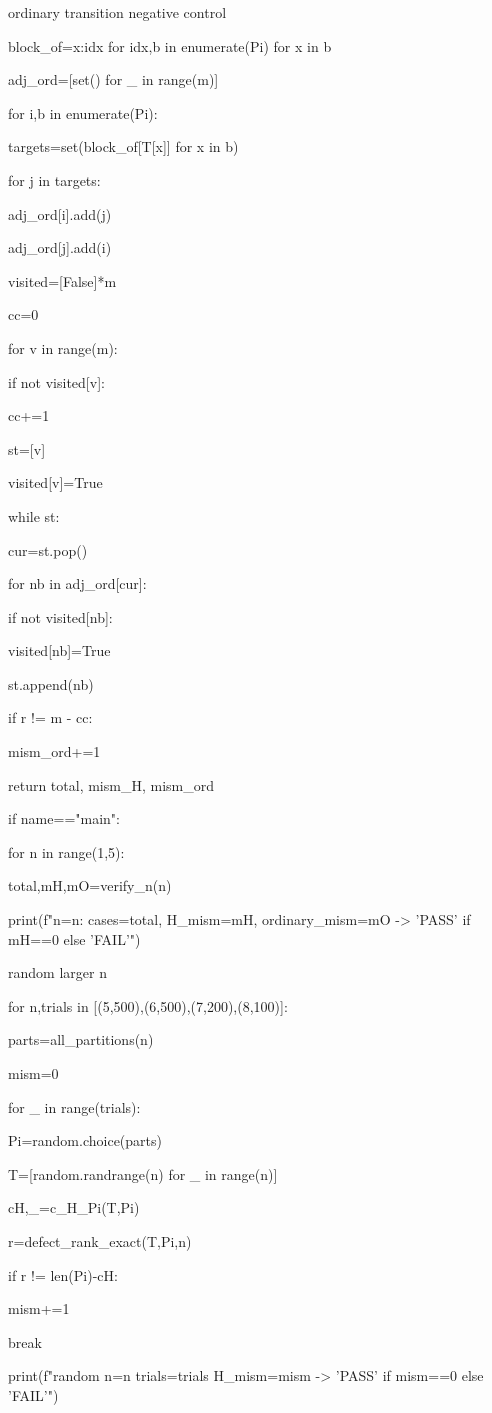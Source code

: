 ordinary transition negative control


block_of={x:idx for idx,b in enumerate(Pi) for x in b}

adj_ord=[set() for _ in range(m)]

for i,b in enumerate(Pi):

targets=set(block_of[T[x]] for x in b)

for j in targets:

adj_ord[i].add(j)

adj_ord[j].add(i)

visited=[False]*m

cc=0

for v in range(m):

if not visited[v]:

cc+=1

st=[v]

visited[v]=True

while st:

cur=st.pop()

for nb in adj_ord[cur]:

if not visited[nb]:

visited[nb]=True

st.append(nb)

if r != m - cc:

mism_ord+=1

return total, mism_H, mism_ord


if name=="main":

for n in range(1,5):

total,mH,mO=verify_n(n)

print(f"n={n}: cases={total}, H_mism={mH}, ordinary_mism={mO} -> {'PASS' if mH==0 else 'FAIL'}")


random larger n


for n,trials in [(5,500),(6,500),(7,200),(8,100)]:

parts=all_partitions(n)

mism=0

for _ in range(trials):

Pi=random.choice(parts)

T=[random.randrange(n) for _ in range(n)]

cH,_=c_H_Pi(T,Pi)

r=defect_rank_exact(T,Pi,n)

if r != len(Pi)-cH:

mism+=1

break

print(f"random n={n} trials={trials} H_mism={mism} -> {'PASS' if mism==0 else 'FAIL'}")

